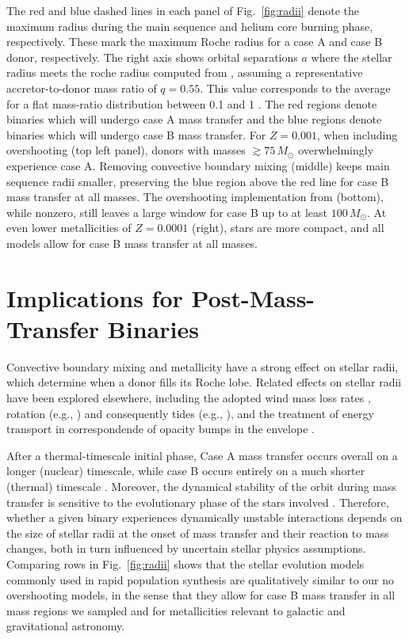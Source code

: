 \documentclass[twocolumn]{aastex63}
\DeclareRobustCommand{\Figref}[1]{Fig.~\ref{#1}}
\begin{document}
The red and blue dashed lines in each panel of \Figref{fig:radii}
denote the maximum radius during the main sequence and helium core
burning phase, respectively. These mark the maximum Roche radius for a
case A and case B donor, respectively. The right axis shows orbital
separations $a$ where the stellar radius meets the roche radius
computed from \citet{eggleton:83}, assuming a representative
accretor-to-donor mass ratio of $q=0.55$. This value corresponds to
the average for a flat mass-ratio distribution between 0.1 and 1
\citep{kobulnicky:07,sana:12}. The red regions denote binaries which
will undergo case A mass transfer and the blue regions denote binaries
which will undergo case B mass transfer. For $Z=0.001$, when including
overshooting (top left panel), donors with masses
$ \gtrsim 75 \, M_{\odot}$ overwhelmingly experience case A.  Removing
convective boundary mixing (middle) keeps main sequence radii smaller,
preserving the blue region above the red line for case B mass transfer
at all masses. The overshooting implementation from \cite{pols:98}
(bottom), while nonzero, still leaves a large window for case B up to
at least $100 \, M_{\odot}$. At even lower metallicities of $Z=0.0001$
(right), stars are more compact, and all models allow for case B mass
transfer at all masses.

\section{Implications for Post-Mass-Transfer Binaries}

Convective boundary mixing \citep{brott:11, johnston:24} and
metallicity \citep[e.g.,][]{xin:22} have a strong effect on stellar
radii, which determine when a donor fills its Roche lobe. Related
effects on stellar radii have been explored elsewhere, including the
adopted wind mass loss rates \citep[e.g.,][]{smith:14, renzo:17,
  josiek:24}, rotation (e.g., \citealt{maeder:00}) and consequently
tides (e.g., \citealt{fabry:22}), and the treatment of energy
transport in correspondende of opacity bumps in the envelope
\citep[e.g.,][]{joss:73, agrawal:22, cheng:24}.

After a thermal-timescale initial phase, Case A mass transfer occurs
overall on a longer (nuclear) timescale, while case B occurs entirely
on a much shorter (thermal) timescale \citep[but see][]{klencki:22}.
Moreover, the dynamical stability of the orbit during mass transfer is
sensitive to the evolutionary phase of the stars involved
\citep[e.g.,][]{claeys:14}. Therefore, whether a given binary
experiences dynamically unstable interactions depends on the size of
stellar radii at the onset of mass transfer and their reaction to mass
changes, both in turn influenced by uncertain stellar physics
assumptions. Comparing rows in \Figref{fig:radii} shows that the
stellar evolution models commonly used in rapid population synthesis
are qualitatively similar to our no overshooting models, in the sense
that they allow for case B mass transfer in all mass regions we
sampled and for metallicities relevant to galactic and gravitational
astronomy.
\end{document}
